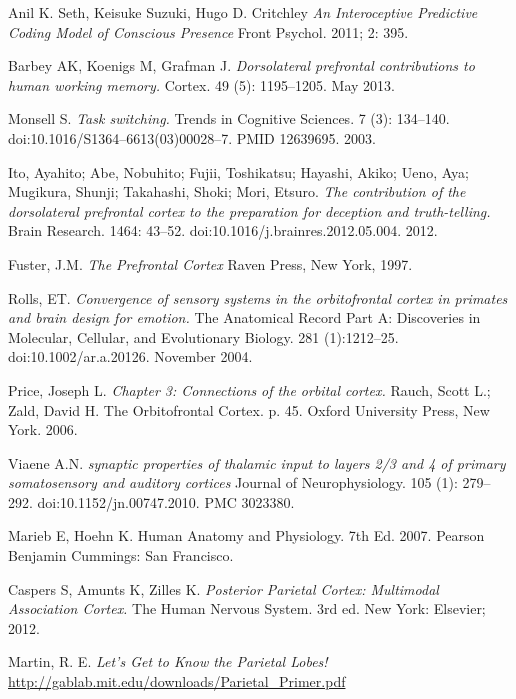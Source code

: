 \documentclass[a4paper, amsfonts, amssymb, amsmath, reprint, showkeys, nofootinbib, twoside]{revtex4-1}
\begin{document}
\begin{thebibliography}{99}
  Anil K. Seth, Keisuke Suzuki, Hugo D. Critchley
  \textit {An Interoceptive Predictive Coding Model of Conscious Presence}
  Front Psychol. 2011; 2: 395.

  Barbey AK, Koenigs M, Grafman J.
  \textit{Dorsolateral prefrontal contributions to human working memory.}
  Cortex. 49 (5): 1195–1205. May 2013.

  Monsell S.
  \textit{Task switching.}
  Trends in Cognitive Sciences. 7 (3):
  134–140. doi:10.1016/S1364–6613(03)00028–7. PMID 12639695. 2003.

  Ito, Ayahito; Abe, Nobuhito; Fujii, Toshikatsu; Hayashi, Akiko; Ueno, Aya;
  Mugikura, Shunji; Takahashi, Shoki; Mori, Etsuro.
  \textit{The contribution of the dorsolateral prefrontal cortex to the preparation
    for deception and truth-telling.}
  Brain Research. 1464: 43–52. doi:10.1016/j.brainres.2012.05.004. 2012.

  Fuster, J.M.
  \textit{The Prefrontal Cortex}
  Raven Press, New York, 1997.

  Rolls, ET.
  \textit{Convergence of sensory systems in the orbitofrontal
    cortex in primates and brain design for emotion.}
  The Anatomical Record Part A: Discoveries in Molecular, Cellular, and Evolutionary
  Biology. 281 (1):1212–25. doi:10.1002/ar.a.20126. November 2004.

  Price, Joseph L.
  \textit{Chapter 3: Connections of the orbital cortex.}
  Rauch, Scott L.; Zald, David H.
  The Orbitofrontal Cortex. p. 45.
  Oxford University Press, New York. 2006.

  Viaene A.N.
  \textit {synaptic properties of thalamic input to layers 2/3 and 4 of
              primary somatosensory and auditory cortices}
  Journal of Neurophysiology. 105 (1): 279–292.
  doi:10.1152/jn.00747.2010. PMC 3023380.

  Marieb E, Hoehn K.
  Human Anatomy and Physiology.
  7th Ed. 2007. Pearson Benjamin Cummings: San Francisco.

  Caspers S, Amunts K, Zilles K.
  \textit {Posterior Parietal Cortex: Multimodal Association Cortex.}
   The Human Nervous System. 3rd ed. New York: Elsevier; 2012.

  Martin, R. E.
  \textit{Let’s Get to Know the Parietal Lobes!}
  \url{http://gablab.mit.edu/downloads/Parietal_Primer.pdf}


\end{thebibliography}
\end{document}
